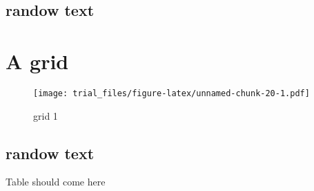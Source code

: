 \documentclass[]{article}
\begin{document}
\subsection{randow text}\label{randow-text-11}

\lipsum

\section{A grid}\label{a-grid-5}

\begin{figure}[htbp]
\centering
\texttt{[image: trial\_files/figure-latex/unnamed-chunk-20-1.pdf]}
\caption{grid 1}
\end{figure}

\subsection{randow text}\label{randow-text-12}

\lipsum

Table should come here
\end{document}

